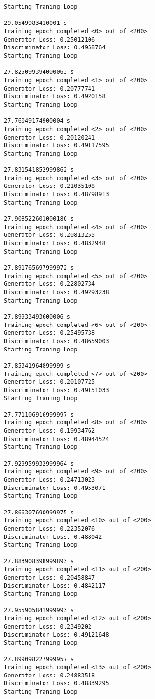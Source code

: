 \documentclass[11pt]{article}
\begin{document}
    \begin{Verbatim}[commandchars=\\\{\}]
Starting Traning Loop 

29.0549983410001 s
Training epoch completed <0> out of <200>
Generator Loss: 0.25012106
Discriminator Loss: 0.4958764
Starting Traning Loop 

27.825099394000063 s
Training epoch completed <1> out of <200>
Generator Loss: 0.20777741
Discriminator Loss: 0.4920158
Starting Traning Loop 

27.76049174900004 s
Training epoch completed <2> out of <200>
Generator Loss: 0.20120241
Discriminator Loss: 0.49117595
Starting Traning Loop 

27.831541852999862 s
Training epoch completed <3> out of <200>
Generator Loss: 0.21035108
Discriminator Loss: 0.48798913
Starting Traning Loop 

27.908522601000186 s
Training epoch completed <4> out of <200>
Generator Loss: 0.20813255
Discriminator Loss: 0.4832948
Starting Traning Loop 

27.891765697999972 s
Training epoch completed <5> out of <200>
Generator Loss: 0.22802734
Discriminator Loss: 0.49293238
Starting Traning Loop 

27.89933493600006 s
Training epoch completed <6> out of <200>
Generator Loss: 0.25495738
Discriminator Loss: 0.48659003
Starting Traning Loop 

27.85341964899999 s
Training epoch completed <7> out of <200>
Generator Loss: 0.20107725
Discriminator Loss: 0.49151033
Starting Traning Loop 

27.771106916999997 s
Training epoch completed <8> out of <200>
Generator Loss: 0.19934762
Discriminator Loss: 0.48944524
Starting Traning Loop 

27.929959932999964 s
Training epoch completed <9> out of <200>
Generator Loss: 0.24713023
Discriminator Loss: 0.4953071
Starting Traning Loop 

27.866307690999975 s
Training epoch completed <10> out of <200>
Generator Loss: 0.22352076
Discriminator Loss: 0.488042
Starting Traning Loop 

27.883908398999893 s
Training epoch completed <11> out of <200>
Generator Loss: 0.20458847
Discriminator Loss: 0.4842117
Starting Traning Loop 

27.955905841999993 s
Training epoch completed <12> out of <200>
Generator Loss: 0.2349202
Discriminator Loss: 0.49121648
Starting Traning Loop 

27.899098227999957 s
Training epoch completed <13> out of <200>
Generator Loss: 0.24883518
Discriminator Loss: 0.48839295
Starting Traning Loop 


\end{Verbatim}
\end{document}

